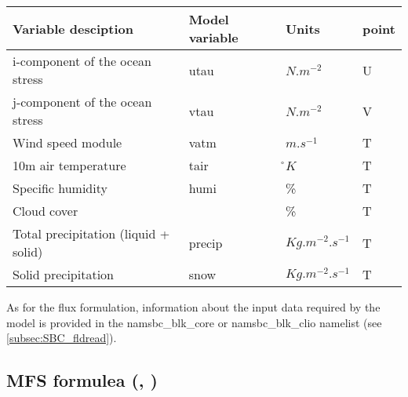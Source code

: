 \documentclass[../tex_main/NEMO_manual]{subfiles}
\begin{document}
\begin{table}[htbp]   \label{tab:CLIO}
\begin{center}
\begin{tabular}{|l|l|l|l|}
\hline
Variable desciption				& Model variable	& Units				& point \\	\hline
i-component of the ocean stress		& utau			& $N.m^{-2}$			& U \\	\hline
j-component of the ocean stress		& vtau			& $N.m^{-2}$			& V \\	\hline
Wind speed module					& vatm			& $m.s^{-1}$			& T \\	\hline
10m air temperature					& tair			& \r{}$K$				& T \\	\hline
Specific humidity						& humi			& \%					& T \\	\hline
Cloud cover							& 				& \%					& T \\	\hline
Total precipitation (liquid + solid)	& precip		& $Kg.m^{-2}.s^{-1}$	& T \\	\hline
Solid precipitation 					& snow			& $Kg.m^{-2}.s^{-1}$	& T \\	\hline
\end{tabular}
\end{center}
\end{table}

As for the flux formulation, information about the input data required by the 
model is provided in the namsbc\_blk\_core or namsbc\_blk\_clio 
namelist (see \autoref{subsec:SBC_fldread}). 

\subsection{MFS formulea (\protect{}, \protect{})}
\label{subsec:SBC_blk_mfs}
%
\end{document}
